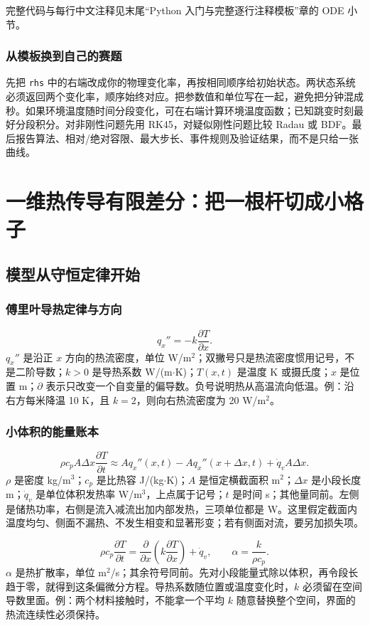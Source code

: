 \documentclass[UTF8,zihao=-4,openany,oneside,fontset=windows]{ctexbook}
\begin{document}
完整代码与每行中文注释见末尾“Python 入门与完整逐行注释模板”章的 ODE 小节。

\subsection{从模板换到自己的赛题}
先把 \texttt{rhs} 中的右端改成你的物理变化率，再按相同顺序给初始状态。两状态系统必须返回两个变化率，顺序始终对应。把参数值和单位写在一起，避免把分钟混成秒。如果环境温度随时间分段变化，可在右端计算环境温度函数；已知跳变时刻最好分段积分。对非刚性问题先用 RK45，对疑似刚性问题比较 Radau 或 BDF。最后报告算法、相对/绝对容限、最大步长、事件规则及验证结果，而不是只给一张曲线。

\chapter{一维热传导有限差分：把一根杆切成小格子}
\section{模型从守恒定律开始}
\subsection{傅里叶导热定律与方向}
\begin{equation}
q_x''=-k\frac{\partial T}{\partial x}.
\end{equation}
$q_x''$ 是沿正 $x$ 方向的热流密度，单位 W/m$^2$；双撇号只是热流密度惯用记号，不是二阶导数；$k>0$ 是导热系数 W/(m$\cdot$K)；$T(x,t)$ 是温度 K 或摄氏度；$x$ 是位置 m；$\partial$ 表示只改变一个自变量的偏导数。负号说明热从高温流向低温。例：沿右方每米降温 10 K，且 $k=2$，则向右热流密度为 20 W/m$^2$。

\subsection{小体积的能量账本}
\begin{equation}
\rho c_p A\Delta x\frac{\partial T}{\partial t}
\approx A q_x''(x,t)-A q_x''(x+\Delta x,t)+\dot q_v A\Delta x.
\end{equation}
$\rho$ 是密度 kg/m$^3$；$c_p$ 是比热容 J/(kg$\cdot$K)；$A$ 是恒定横截面积 m$^2$；$\Delta x$ 是小段长度 m；$\dot q_v$ 是单位体积发热率 W/m$^3$，上点属于记号；$t$ 是时间 s；其他量同前。左侧是储热功率，右侧是流入减流出加内部发热，三项单位都是 W。这里假定截面内温度均匀、侧面不漏热、不发生相变和显著形变；若有侧面对流，要另加损失项。

\begin{equation}
\rho c_p\frac{\partial T}{\partial t}=\frac{\partial}{\partial x}\left(k\frac{\partial T}{\partial x}\right)+\dot q_v,
\qquad \alpha=\frac{k}{\rho c_p}.
\end{equation}
$\alpha$ 是热扩散率，单位 m$^2$/s；其余符号同前。先对小段能量式除以体积，再令段长趋于零，就得到这条偏微分方程。导热系数随位置或温度变化时，$k$ 必须留在空间导数里面。例：两个材料接触时，不能拿一个平均 $k$ 随意替换整个空间，界面的热流连续性必须保持。
\end{document}
